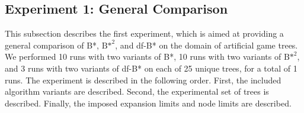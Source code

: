 \subsection{Experiment 1: General Comparison}
\label{subsec:Exp1}
This subsection describes the first experiment, which is aimed at providing a general comparison of B*, ${\text{B*}}^2$, and df-B* on the domain of artificial game trees. We performed 10 runs with two variants of B*, 10 runs with two variants of ${\text{B*}}^2$, and 3 runs with two variants of df-B* on each of 25 unique trees, for a total of 1 runs. The experiment is described in the following order. First, the included algorithm variants are described. Second, the experimental set of trees is described. Finally, the imposed expansion limits and node limits are described.

